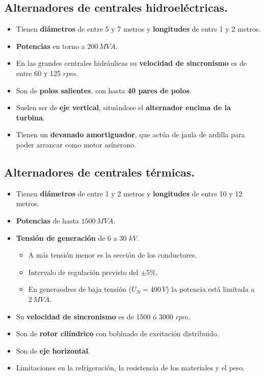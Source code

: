 		\subsection{Alternadores de centrales hidroeléctricas.}
			\begin{itemize}
				\item Tienen \textbf{diámetros} de entre 5 y 7 metros y \textbf{longitudes} de entre 1 y 2 metros.
				\item \textbf{Potencias} en torno a $200\,MV\!A$.
				\item En las grandes centrales hidráulicas su \textbf{velocidad de sincronismo} es de entre 60 y 125 $rpm$.
				\item Son de \textbf{polos salientes}, con hasta \textbf{40 pares de polos}.
				\item Suelen ser de \textbf{eje vertical}, situándose el \textbf{alternador encima de la turbina}.
				\item Tienen un \textbf{devanado amortiguador}, que actúa de jaula de ardilla para poder arrancar como motor asíncrono.
			\end{itemize}
			    
		\subsection{Alternadores de centrales térmicas.}
			\begin{itemize}
				\item Tienen \textbf{diámetros} de entre 1 y 2 metros y \textbf{longitudes} de entre 10 y 12 metros.
				\item \textbf{Potencias} de hasta $1500\,MV\!A$.
				\item \textbf{Tensión de generación} de 6 a 30 $kV$.
					\begin{itemize}
						\item A más tensión menor es la sección de los conductores.
						\item Intervalo de regulación previsto del $\pm 5\%$.
						\item En generaodres de baja tensión ($U_N = 400\,V$) la potencia está limitada a $2\,MV\!A$.
					\end{itemize}	
				\item Su \textbf{velocidad de sincronismo} es de 1500 ó 3000 $rpm$.
				\item Son de \textbf{rotor cilíndrico} con bobinado de excitación distribuido.
				\item Son de \textbf{eje horizontal}.
				\item Limitaciones en la refrigeración, la resistencia de los materiales y el peso.
			\end{itemize}
			
